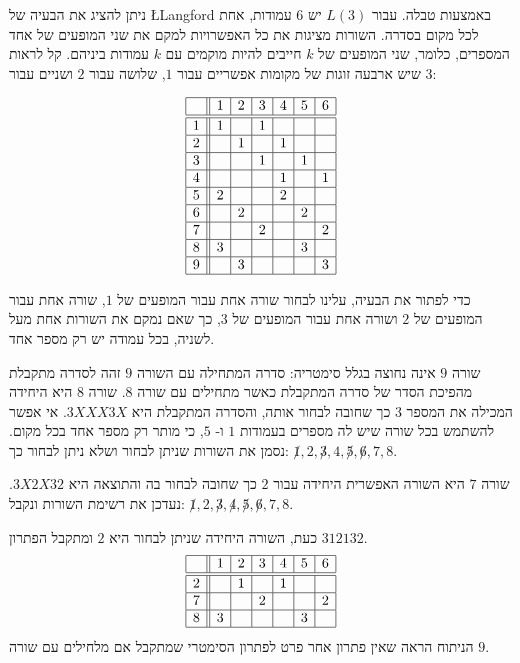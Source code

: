 ניתן להציג את הבעיה של
\L{Langford}
באמצעות טבלה. עבור
$L(3)$
יש
$6$
עמודות, אחת לכל מקום בסדרה. השורות מציגות את כל האפשרויות למקם את  שני המופעים של אחד המספרים, כלומר, שני המופעים של
$k$
חייבים להיות מוקמים עם 
$k$
עמודות ביניהם. קל לראות שיש ארבעה זוגות של מקומות אפשריים עבור
$1$,
שלושה עבור
$2$
ושניים עבור
$3$:

\[
\begin{array}{|c||c|c|c|c|c|c|}
\hline
&1&2&3&4&5&6\\\hline\hline
1&1&&1&&&\\\hline
2&&1&&1&&\\\hline
3&&&1&&1&\\\hline
4&&&&1&&1\\\hline
5&2&&&2&&\\\hline
6&&2&&&2&\\\hline
7&&&2&&&2\\\hline
8&3&&&&3&\\\hline
9&&3&&&&3\\\hline
\end{array}
\]


כדי לפתור את הבעיה, עלינו לבחור שורה אחת עבור המופעים של
$1$,
שורה אחת עבור המופעים של
$2$
ושורה אחת עבור המופעים של
$3$,
כך שאם נמקם את השורות אחת מעל לשניה, בכל עמודה יש רק מספר אחד.

שורה
$9$
אינה נחוצה בגלל סימטריה: סדרה המתחילה עם השורה
$9$
זהה לסדרה מתקבלת מהפיכת הסדר של סדרה המתקבלת כאשר מתחילים עם שורה
$8$.
שורה 
$8$
היא היחידה המכילה את המספר
$3$
כך שחובה לבחור אותה, והסדרה המתקבלת היא
$3X  X  X  3X$. 
אי אפשר להשתמש בכל שורה שיש לה מספרים בעמודות
$1$
ו-%
$5$,
כי מותר רק מספר אחד בכל מקום. נסמן את השורות שניתן לבחור ושלא ניתן לבחור כך:
$\not 1,2,\not 3,4,\not 5, \not 6, 7, 8$.

שורה
$7$
היא השורה האפשרית היחידה עבור
$2$
כך שחובה לבחור בה והתוצאה היא
$3X  2X  3{}2$.
נעדכן את רשימת השורות ונקבל:
$\not 1,2,\not 3,\not 4,\not 5, \not 6, 7, 8$.

כעת, השורה היחידה שניתן לבחור היא
$2$
ומתקבל הפתרון
$3{}1{}2{}1{}3{}2$.
\[
\begin{array}{|c||c|c|c|c|c|c|}
\hline
&1&2&3&4&5&6\\\hline\hline
2&&1&&1&&\\\hline
7&&&2&&&2\\\hline
8&3&&&&3&\\\hline
\end{array}
\]
הניתוח הראה שאין פתרון אחר פרט לפתרון הסימטרי שמתקבל אם מלחילים עם שורה
$9$.

